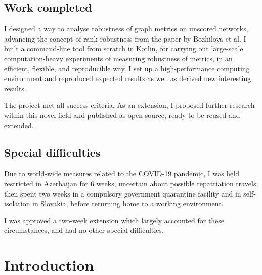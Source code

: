 \documentclass[12pt,a4paper,twoside,openany]{report}
\begin{document}
    \section*{Work completed}

    I designed a way to analyse robustness of graph metrics on unscored networks, advancing the concept of rank robustness from the paper by Bozhilova et al.
    I built a command-line tool \graffs from scratch in Kotlin, for carrying out large-scale computation-heavy experiments of measuring robustness of metrics, in an efficient, flexible, and reproducible way.
    I set up a high-performance computing environment and reproduced expected results as well as derived new interesting results.

    The project met all success criteria.
    As an extension, I proposed further research within this novel field and published \graffs as open-source, ready to be reused and extended.


    \section*{Special difficulties}

    Due to world-wide measures related to the COVID-19 pandemic, I was held restricted in Azerbaijan for 6 weeks, uncertain about possible repatriation travels, then spent two weeks in a compulsory government quarantine facility and in self-isolation in Slovakia, before returning home to a working environment.

    I was approved a two-week extension which largely accounted for these circumstances, and had no other special difficulties.


    \tableofcontents

    \listoffigures

    \listoftables

    \lstlistoflistings


    \pagestyle{headings}


%    

    \chapter{Introduction}\label{ch:introduction}
    
\end{document}
